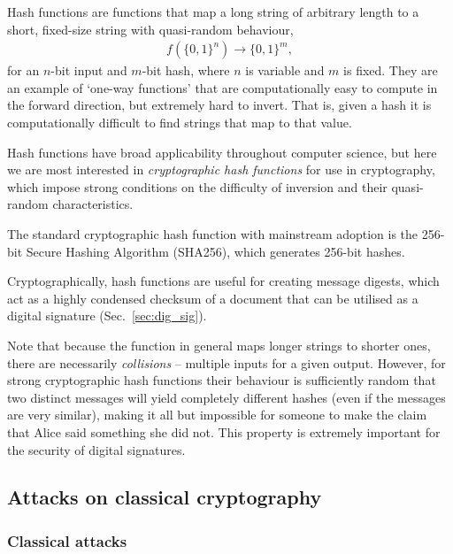 Hash functions are functions that map a long string of arbitrary length to a short, fixed-size string with quasi-random behaviour,
\begin{align}
	f(\{0,1\}^n) \to \{0,1\}^m,
\end{align}
for an $n$-bit input and $m$-bit hash, where $n$ is variable and $m$ is fixed. They are an example of `one-way functions' that are computationally easy to compute in the forward direction, but extremely hard to invert. That is, given a hash it is computationally difficult to find strings that map to that value.

Hash functions have broad applicability throughout computer science, but here we are most interested in \textit{cryptographic hash functions} for use in cryptography, which impose strong conditions on the difficulty of inversion and their quasi-random characteristics.

The standard cryptographic hash function with mainstream adoption is the 256-bit Secure Hashing Algorithm (SHA256), which generates 256-bit hashes.

Cryptographically, hash functions are useful for creating message digests, which act as a highly condensed checksum of a document that can be utilised as a digital signature (Sec.~\ref{sec:dig_sig}).

Note that because the function in general maps longer strings to shorter ones, there are necessarily \textit{collisions} -- multiple inputs for a given output. However, for strong cryptographic hash functions their behaviour is sufficiently random that two distinct messages will yield completely different hashes (even if the messages are very similar), making it all but impossible for someone to make the claim that Alice said something she did not. This property is extremely important for the security of digital signatures.

%
%

\subsection{Attacks on classical cryptography}\label{sec:attacks_on_class}

%
%

\subsubsection{Classical attacks}

